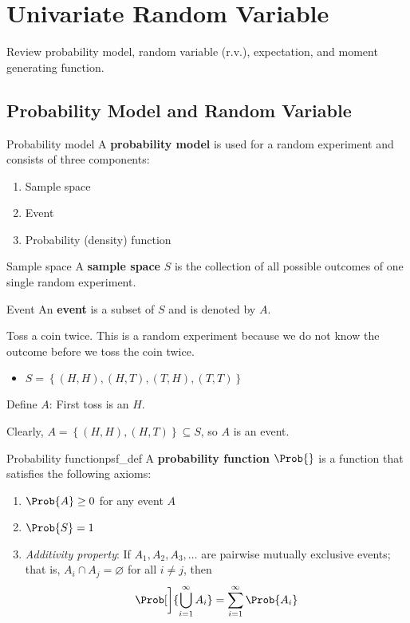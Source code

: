 \setcounter{chapter}{1}
\chapter{Univariate Random Variable}
Review probability model, random variable (r.v.),
expectation, and moment generating function.

\section{Probability Model and Random Variable}
\begin{Definition}{Probability model}{}
    A \textbf{probability model} is used for a random
    experiment and consists of three components:
    \begin{enumerate}[label=(\Roman*)]
        \item Sample space
        \item Event
        \item Probability (density) function
    \end{enumerate}
\end{Definition}

\begin{Definition}{Sample space}{}
    A \textbf{sample space} $ S $ is
    the collection of all possible outcomes of one single
    random experiment.
\end{Definition}
\begin{Definition}{Event}{}
    An \textbf{event} is a subset of $ S $ and is denoted
    by $ A $.
\end{Definition}

\begin{Example}{}{}
    Toss a coin twice. This is a random experiment because
    we do not know the outcome before we toss the coin twice.
    \begin{itemize}
        \item $ S=\left\{ (H,H),(H,T),(T,H),(T,T)\right\} $
    \end{itemize}
    Define $ A $: First toss is an $ H $.

    Clearly, $ A=\left\{ (H,H),(H,T)\right\}\subseteq S $, so $ A $ is an event.
\end{Example}

\begin{Definition}{Probability function}{psf_def}
    A \textbf{probability function} $ \Prob{} $
    is a function that satisfies the following axioms:
    \begin{enumerate}[label=(\Roman*)]
        \item\label{psf_def_1} $ \Prob{A}\ge 0 $ for any event $ A $
        \item\label{psf_def_2} $ \Prob{S}=1 $
        \item\label{psf_def_3} \emph{Additivity property}: If $ A_1,A_2,A_3,\ldots $
              are pairwise mutually exclusive events; that is, $ A_i\cap A_j=\varnothing $
              for all $ i\neq j $, then
              \[ \Prob[\bigg]{\bigcup_{i=1}^{\infty}A_i}=\sum\limits_{i=1}^{\infty} \Prob{A_i} \]
    \end{enumerate}
\end{Definition}


